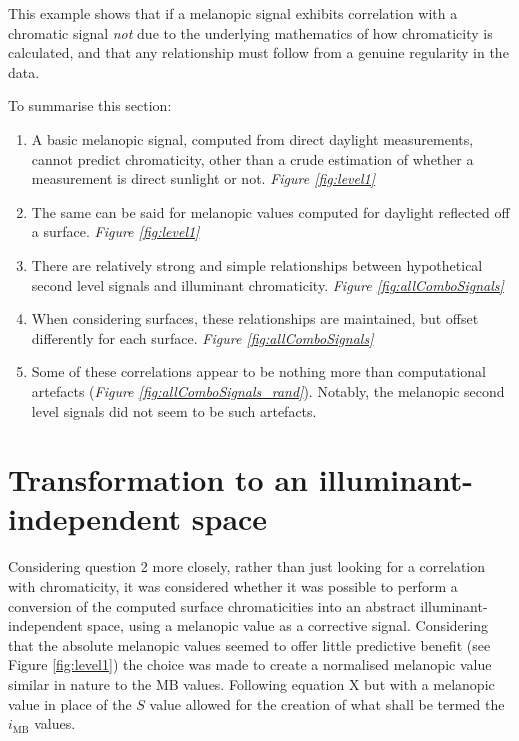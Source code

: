 This example shows that if a melanopic signal exhibits correlation with a chromatic signal \emph{not} due to the underlying mathematics of how chromaticity is calculated, and that any relationship must follow from a genuine regularity in the data.

\noindent
To summarise this section:

\begin{enumerate}
   \item A basic melanopic signal, computed from direct daylight measurements, cannot predict chromaticity, other than a crude estimation of whether a measurement is direct sunlight or not. \emph{Figure \ref{fig:level1}}
    \item The same can be said for melanopic values computed for daylight reflected off a surface. \emph{Figure \ref{fig:level1}}
    \item There are relatively strong and simple relationships between hypothetical second level signals and illuminant chromaticity. \emph{Figure \ref{fig:allComboSignals}}
    \item When considering surfaces, these relationships are maintained, but offset differently for each surface. \emph{Figure \ref{fig:allComboSignals}}
    \item Some of these correlations appear to be nothing more than computational artefacts (\emph{Figure \ref{fig:allComboSignals_rand}}). Notably, the melanopic second level signals did not seem to be such artefacts.
\end{enumerate}

\section{Transformation to an illuminant-independent space}

Considering question 2 more closely, rather than just looking for a correlation with chromaticity, it was considered whether it was possible to perform a conversion of the computed surface chromaticities into an abstract illuminant-independent space, using a melanopic value as a corrective signal. Considering that the absolute melanopic values seemed to offer little predictive benefit (see Figure \ref{fig:level1}) the choice was made to create a normalised melanopic value similar in nature to the MB values. Following equation X %
but with a melanopic value in place of the $S$ value allowed for the creation of what shall be termed the $i_{\text{MB}}$ values.

